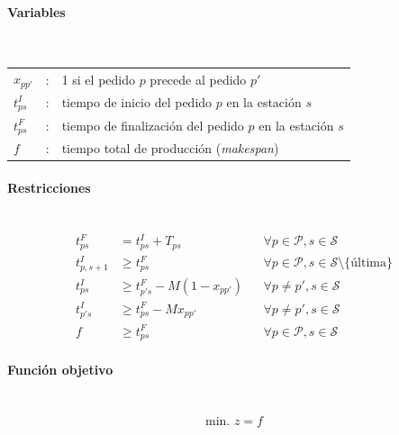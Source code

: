 \paragraph{Variables}\mbox{}\\
\begin{tabular}{l c l}
$x_{pp'}$ & : & 1 si el pedido $p$ precede al pedido $p'$ \\
$t^I_{ps}$ & : & tiempo de inicio del pedido $p$ en la estación $s$ \\
$t^F_{ps}$ & : & tiempo de finalización del pedido $p$ en la estación $s$ \\
$f$ & : & tiempo total de producción (\textit{makespan}) \\
\end{tabular}

\paragraph{Restricciones}\mbox{}\\
\begin{align}
t^F_{ps} &= t^I_{ps} + T_{ps} && \forall p\in\mathcal{P}, s\in\mathcal{S} \\
t^I_{p,s+1} &\ge t^F_{ps} && \forall p\in\mathcal{P}, s\in\mathcal{S}\setminus\{\text{última}\} \\
t^I_{ps} &\ge t^F_{p's} - M(1-x_{pp'}) && \forall p\ne p', s\in\mathcal{S} \\
t^I_{p's} &\ge t^F_{ps} - Mx_{pp'} && \forall p\ne p', s\in\mathcal{S} \\
f &\ge t^F_{ps} && \forall p\in\mathcal{P}, s\in\mathcal{S}
\end{align}

\paragraph{Función objetivo}\mbox{}\\
\begin{align}
\mbox{min. } z = f
\end{align}
